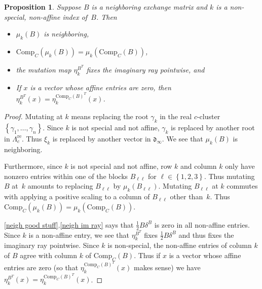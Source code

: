 \documentclass{amsart}
\newtheorem{proposition}{Proposition}[section]
\theoremstyle{definition}
\theoremstyle{remark}
\numberwithin{equation}{section}
\newcommand{\set}[1]{{\left\lbrace #1 \right\rbrace}}
\newcommand{\0}{{\mathbf{0}}}
\newcommand{\Comp}{\mathrm{Comp}_C}
\newcommand{\re}{\mathrm{re}}
\renewcommand{\d}{{\mathfrak d}}
\newcommand{\APTChar}{\Lambda}
\newcommand{\APT}[1]{\APTChar_{#1}}
\newcommand{\APTre}[1]{\APT{#1}^\re}
\begin{document}
\begin{proposition}\label{nonspecial mut}
Suppose $B$ is a neighboring exchange matrix and $k$ is a non-special, non-affine index of~$B$.
Then 
\begin{itemize}
\item
$\mu_k(B)$ is neighboring,
\item
$\Comp(\mu_k(B))=\mu_k(\Comp(B))$,
\item
the mutation map $\eta^{B^T}_k$ fixes the imaginary ray pointwise, and 
\item
If $x$ is a vector whose affine entries are zero, then $\eta^{B^T}_k(x)=\eta^{\Comp(B)^T}_k(x)$.
\end{itemize}
\end{proposition}
\begin{proof}
Mutating at $k$ means replacing the root $\gamma_k$ in the real $c$-cluster $\set{\gamma_1,\ldots,\gamma_n}$.
Since $k$ is not special and not affine, $\gamma_k$ is replaced by another root in $\APTre{c}$.
Thus $\xi_k$ is replaced by another vector in $\d_\infty$.
We see that $\mu_k(B)$ is neighboring.

Furthermore, since $k$ is not special and not affine, row $k$ and column $k$ only have nonzero entries within one of the blocks $B_{\ell\ell}$ for $\ell\in\set{1,2,3}$.
Thus mutating~$B$ at~$k$ amounts to replacing $B_{\ell\ell}$ by $\mu_k(B_{\ell\ell})$.
Mutating $B_{\ell\ell}$ at $k$ commutes with applying a positive scaling to a column of $B_{\ell\ell}$ other than~$k$.
Thus ${\Comp(\mu_k(B))=\mu_k(\Comp(B))}$.

\cref{neigh good stuff}.\ref{neigh im ray} says that $\frac12B\delta^B$ is zero in all non-affine entries.
Since $k$ is a non-affine entry, we see that $\eta^{B^T}_k$ fixes $\frac12B\delta^B$ and thus fixes the imaginary ray pointwise.
Since $k$ is non-special, the non-affine entries of column $k$ of $B$ agree with column $k$ of $\Comp(B)$.
Thus if $x$ is a vector whose affine entries are zero (so that $\eta^{\Comp(B)^T}_k(x)$ makes sense) we have $\eta^{B^T}_k(x)=\eta^{\Comp(B)^T}_k(x)$.
\end{proof}
\end{document}

